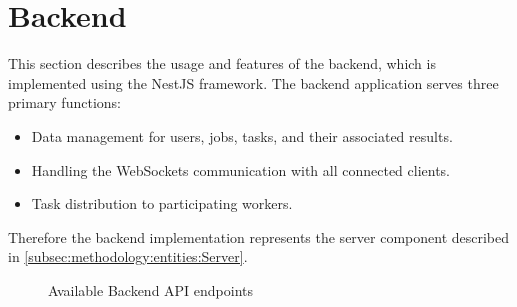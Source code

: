 \section{Backend}
\label{sec:implementation:backend}
This section describes the usage and features of the backend, which is implemented using the NestJS framework. The backend application serves three primary functions: 
\begin{itemize}
    \item Data management for users, jobs, tasks, and their associated results.
    \item Handling the WebSockets communication with all connected clients.
    \item Task distribution to participating workers.
\end{itemize}
Therefore the backend implementation represents the server component described in \autoref{subsec:methodology:entities:Server}.
\begin{figure}[bth]
    \myfloatalign
     \quad \quad
    \caption{Available Backend \acs{API} endpoints}
    \label{fig:implementation:backend}
\end{figure}
